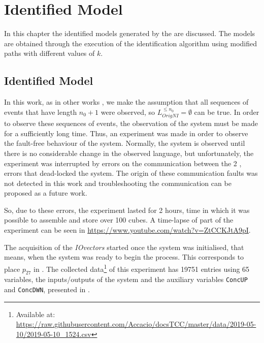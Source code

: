 \chapter{Identified Model}
\label{cha:results}
In this chapter the identified models generated by the
 are discussed. The models are obtained through the
execution of the identification algorithm using modified paths with different
values of $k$.

\section{Identified Model}
In this work, as in other works \cite{moreira2018enhanced,klein2005fault}, we
make the assumption that all
sequences of events that have length $n_0+1$ were observed, so 
$L_{OrigNI}^{\leq n_0}=\emptyset$ can be true. In order to observe these
sequences of events, the observation of the system must be made for a sufficiently
long time. Thus, an experiment was made in order to observe the fault-free
behaviour of the system.
Normally, the system is observed until there is no considerable change in the
observed language, but unfortunately, the experiment was interrupted by errors on the communication
between the 2 \PLCs{}, errors that dead-locked the system. The origin of these
communication faults was not detected in this work and troubleshooting the
communication can be proposed as a future work. 

So, due to these errors, the experiment lasted for 2
hours, time in which it was possible to assemble and store over 100 cubes. A time-lapse of part of the experiment can be seen in
\url{https://www.youtube.com/watch?v=ZtCCKJtA9pI}.

The acquisition of the \emph{IOvectors} started once the system was initialised, that means,
when the system was ready to begin the process. This corresponds to place
\hyperlink{partialTable:p27}{$p_{27}$} in .
The collected data\footnote{Available at:
  \url{https://raw.githubusercontent.com/Accacio/docsTCC/master/data/2019-05-10/2019-05-10_1524.csv}}
of this experiment has 19751 entries using 65
variables, the inputs\slash outputs of the system and the auxiliary variables
\verb|ConcUP| and \verb|ConcDWN|, presented in .

